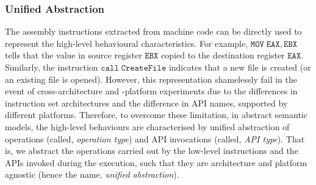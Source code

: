 \subsubsection{Unified Abstraction} 
The assembly instructions extracted from  machine code can be directly used to represent the high-level behavioural characteristics. For example, $\mathtt{MOV\;EAX,EBX}$ tells that the value in source register $\mathtt{EBX}$ copied to the destination register $\mathtt{EAX}$. Similarly, the instruction $\mathtt{call\;CreateFile}$ indicates that a new file is created (or an existing file is opened). However, this representation shamelessly fail in the event of cross-architecture and -platform experiments due to the differences in instruction set architectures and the difference in API names, supported by different platforms. Therefore, to overcome these limitation, in abstract semantic models, the high-level behaviours are characterised by unified abstraction of operations (called, \textit{operation type}) and API invocations (called, \textit{API type}). That is, we abstract the operations carried out by the low-level instructions and the APIs invoked during the execution, such that they are architecture and platform agnostic (hence the name, \textit{unified abstraction}). 

